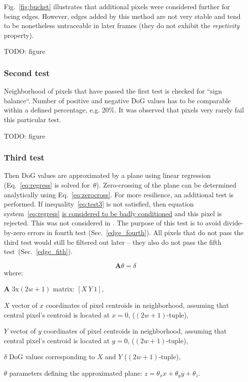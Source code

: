 Fig.~\ref{fig:bucket} illustrates that additional pixels were considered further for being edges. However, edges added by this method are not very stable and tend to be nonetheless untraceable in later frames (they do not exhibit the \textit{repetivity} property).

TODO: figure

\subsubsection{Second test}
\label{edge_second}

Neighborhood of pixels that have passed the first test is checked for ``sign balance``. Number of positive and negative DoG values has to be comparable within a defined percentage, e.g. 20\%. It was observed that pixels very rarely fail this particular test.

TODO: figure

\subsubsection{Third test}
\label{edge_third}

Then DoG values are approximated by a plane using linear regression (Eq.~\ref{eq:regress} is solved for~$\theta$). Zero-crossing of the plane can be determined analytically using Eq.~\ref{eq:zerocross}. For more resilience, an additional test is performed. If inequality~\ref{eq:test3} is not satisfied, then equation system~\ref{eq:regress} \underline{is considered to be badly conditioned} and this pixel is rejected. This was not considered in \cite{jose2015realtime}. The purpose of this test is to avoid divide-by-zero errors in fourth test (Sec.~\ref{edge_fourth}). All pixels that do not pass the third test would still be filtered out later -- they also do not pass the fifth test~(Sec.~\ref{edge_fith}).

\begin{equation}
\bm{A}\theta = \delta
\label{eq:regress}
\end{equation}
where:
\begin{eqwhere}[2cm]
	\item[$\bm{A}$] 3x$(2w+1)$ matrix: $[X\ Y\ 1]$,
	\item[$X$] vector of $x$ coordinates of pixel centroids in neighborhood, assuming that central pixel's centroid is located at $x = 0$, ($(2w+1)$-tuple),
	\item[$Y$] vector of $y$ coordinates of pixel centroids in neighborhood, assuming that central pixel's centroid is located at $y = 0$, ($(2w+1)$-tuple),
	\item[$\delta$] DoG values corresponding to $X$ and $Y$ ($(2w+1)$-tuple),
	\item[$\theta$] parameters defining the approximated plane: $z = \theta_{x}x + \theta_{y}y + \theta_{z}$.
\end{eqwhere}



